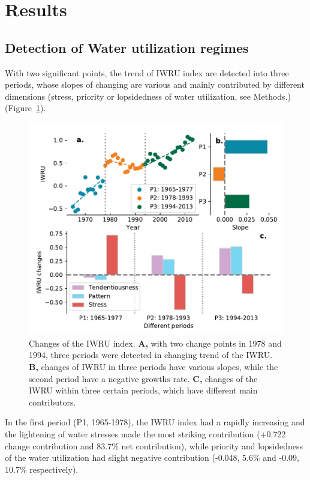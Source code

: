 \documentclass[9pt, twocolumn, twoside, lineno]{pnas-new}
\begin{document}
\section*{Results}
\subsection*{Detection of Water utilization regimes}
With two significant points, the trend of IWRU index are detected into three periods, whose slopes of changing are various and mainly contributed by different dimensions (stress, priority or lopsidedness of water utilization, see Methods.) (Figure~\ref{fig:IWRU}).
\begin{figure}%
	\centering
	\includegraphics[width=\linewidth]{../../figures/main/index.pdf}
	\caption{Changes of the IWRU index. 
	\textbf{A,} with two change points in 1978 and 1994, three periods were detected in changing trend of the IWRU.
	\textbf{B,} changes of IWRU in three periods have various slopes, while the second period have a negative growths rate.
	\textbf{C,} changes of the IWRU within three certain periods, which have different main contributors.
	}
	\label{fig:IWRU}
\end{figure}
In the first period (P1, 1965-1978), the IWRU index had a rapidly increasing and the lightening of water stresses made the most striking contribution (+0.722 change contribution and 83.7\% net contribution), while priority and lopsidedness of the water utilization had slight negative contribution (-0.048, 5.6\% and -0.09, 10.7\% respectively).
\end{document}
